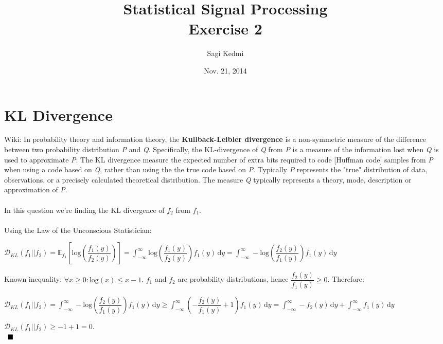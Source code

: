 \documentclass[10pt]{article}
\begin{document}
\title{Statistical Signal Processing\\Exercise 2}
\author{Sagi Kedmi}
\date{Nov. 21, 2014}
\maketitle
\section{KL Divergence}
Wiki: In probability theory and information theory, the \textbf{Kullback-Leibler divergence} is a non-symmetric measure of the difference between two probability distribution \textit{P} and \textit{Q}. Specifically, the KL-divergence of \textit{Q} from \textit{P} is a measure of the information lost when \textit{Q} is used to approximate \textit{P}: The KL divergence measure the expected number of extra bits required to code [Huffman code] samples from \textit{P} when using a code based on \textit{Q}, rather than using the the true code based on \textit{P}. Typically \textit{P} represents the "true" distribution of data, observations, or a precisely calculated theoretical distribution. The measure \textit{Q} typically represents a theory, mode, description or approximation of \textit{P}.
\\\\
In this question we're finding the KL divergence of $f_{2}$ from $f_{1}$.\\\\
Using the Law of the Unconscious Statistician:
\begin{center}
$\mathcal{D}_{KL}\left({f_{1}||f_{2}}\right)=\mathbb{E}_{f_{1}}\left[\mathrm{log}\left({\dfrac{f_{1}(y)}{f_{2}(y)}}\right)\right]={\displaystyle \int_{-\infty}^\infty \mathrm{log}\left({\dfrac{f_{1}(y)}{f_{2}(y)}}\right)f_{1}(y)\,\mathrm{d}y}={\displaystyle \int_{-\infty}^\infty -\mathrm{log}\left({\dfrac{f_{2}(y)}{f_{1}(y)}}\right)f_{1}(y)\,\mathrm{d}y}$
\end{center}
Known inequality: $\forall x\geq 0 : \mathrm{log}(x) \leq x-1$. $f_{1}$ and $f_{2}$ are probability distributions, hence $\dfrac{f_{2}(y)}{f_{1}(y)}\geq 0$. Therefore:
\begin{center}
$\mathcal{D}_{KL}\left({f_{1}||f_{2}}\right)={\displaystyle \int_{-\infty}^\infty -\mathrm{log}\left({\dfrac{f_{2}(y)}{f_{1}(y)}}\right)f_{1}(y)\,\mathrm{d}y}\geq {\displaystyle \int_{-\infty}^\infty \left(-{\dfrac{f_{2}(y)}{f_{1}(y)}} + 1\right)f_{1}(y)\,\mathrm{d}y}={\displaystyle \int_{-\infty}^\infty -f_{2}(y)\,\mathrm{d}y}+{\displaystyle \int_{-\infty}^\infty f_{1}(y)\,\mathrm{d}y}$
\end{center}
\begin{center}
$\mathcal{D}_{KL}\left({f_{1}||f_{2}}\right)\geq -1 +1 = 0.$\\\
$\hfill \blacksquare$
\end{center}
\end{document}
